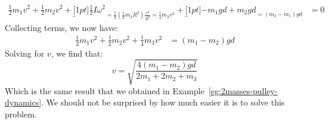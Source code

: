 \begin{example}
\begin{align*}
    \frac12m_1v^2 + \frac12m_2v^2 +
    \underbracket[1pt]{\frac12I\omega^2}_{
      =\frac12\left(\frac12m_3R^2\right)\frac{v^2}{R^2}=\frac14m_3v^2} +
    \underbracket[1pt]{-m_1gd + m_2gd}_{=(m_2-m_1)gd} &= 0
  \end{align*}
  Collecting terms, we now have:
  \begin{align*}
    \frac12m_1v^2 + \frac12 m_2v^2 + \frac14m_3v^2 &= (m_1-m_2)gd
  \end{align*}
  Solving for $v$, we find that:
  \begin{equation*}
    \boxed{v=\sqrt{\frac{4(m_1-m_2)gd}{2m_1+2m_2+m_3}}}
  \end{equation*}
  Which is the same result that we obtained in
  Example~\ref{eg:2masses-pulley-dynamics}. We should not be surprised by
  how much easier it is to solve this problem.
\end{example}
